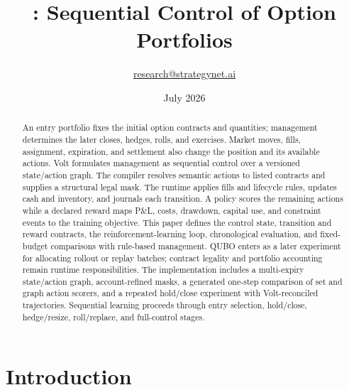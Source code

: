 \documentclass{strategynet-journal}
\title{\VOLT{}: Sequential Control of Option Portfolios}
\author{\href{mailto:research@strategynet.ai}{research@strategynet.ai}}
\date{July 2026}
\newcommand{\VOLT}{\textsf{Volt}}
\begin{document}
\maketitle

\begin{abstract}
An entry portfolio fixes the initial option contracts and quantities; management determines the later closes, hedges, rolls, and exercises.  Market moves, fills, assignment, expiration, and settlement also change the position and its available actions.  \VOLT{} formulates management as sequential control over a versioned state/action graph.  The compiler resolves semantic actions to listed contracts and supplies a structural legal mask.  The runtime applies fills and lifecycle rules, updates cash and inventory, and journals each transition.  A policy scores the remaining actions while a declared reward maps P\&L, costs, drawdown, capital use, and constraint events to the training objective.  This paper defines the control state, transition and reward contracts, the reinforcement-learning loop, chronological evaluation, and fixed-budget comparisons with rule-based management.  QUBO enters as a later experiment for allocating rollout or replay batches; contract legality and portfolio accounting remain runtime responsibilities.  The implementation includes a multi-expiry state/action graph, account-refined masks, a generated one-step comparison of set and graph action scorers, and a repeated hold/close experiment with \VOLT{}-reconciled trajectories.  Sequential learning proceeds through entry selection, hold/close, hedge/resize, roll/replace, and full-control stages.
\end{abstract}

\SNtwocolumntableofcontents

\section{Introduction}
\end{document}
